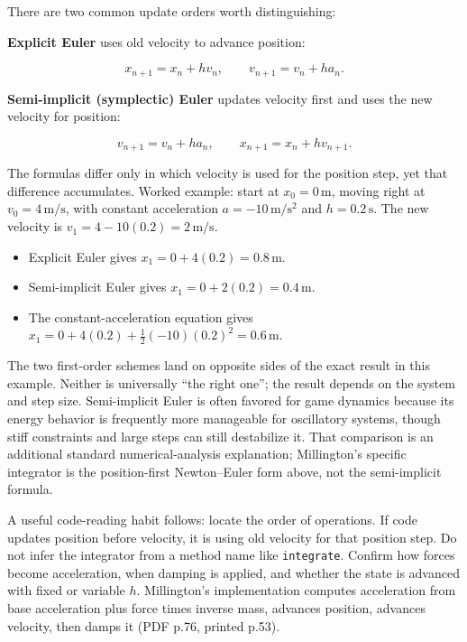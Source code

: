 There are two common update orders worth distinguishing:

\textbf{Explicit Euler} uses old velocity to advance position:

\[
x_{n+1}=x_n+h v_n, \qquad v_{n+1}=v_n+h a_n.
\]

\textbf{Semi-implicit (symplectic) Euler} updates velocity first and uses the new velocity for position:

\[
v_{n+1}=v_n+h a_n, \qquad x_{n+1}=x_n+h v_{n+1}.
\]

The formulas differ only in which velocity is used for the position step, yet that difference accumulates. Worked example: start at \(x_0=0\,\mathrm{m}\), moving right at \(v_0=4\,\mathrm{m/s}\), with constant acceleration \(a=-10\,\mathrm{m/s^2}\) and \(h=0.2\,\mathrm{s}\). The new velocity is \(v_1=4-10(0.2)=2\,\mathrm{m/s}\).

\begin{itemize}
\tightlist
\item
  Explicit Euler gives \(x_1=0+4(0.2)=0.8\,\mathrm{m}\).
\item
  Semi-implicit Euler gives \(x_1=0+2(0.2)=0.4\,\mathrm{m}\).
\item
  The constant-acceleration equation gives \(x_1=0+4(0.2)+\frac12(-10)(0.2)^2=0.6\,\mathrm{m}\).
\end{itemize}

The two first-order schemes land on opposite sides of the exact result in this example. Neither is universally ``the right one''; the result depends on the system and step size. Semi-implicit Euler is often favored for game dynamics because its energy behavior is frequently more manageable for oscillatory systems, though stiff constraints and large steps can still destabilize it. That comparison is an additional standard numerical-analysis explanation; Millington's specific integrator is the position-first Newton--Euler form above, not the semi-implicit formula.

A useful code-reading habit follows: locate the order of operations. If code updates position before velocity, it is using old velocity for that position step. Do not infer the integrator from a method name like \texttt{integrate}. Confirm how forces become acceleration, when damping is applied, and whether the state is advanced with fixed or variable \(h\). Millington's implementation computes acceleration from base acceleration plus force times inverse mass, advances position, advances velocity, then damps it (PDF p.76, printed p.53).

